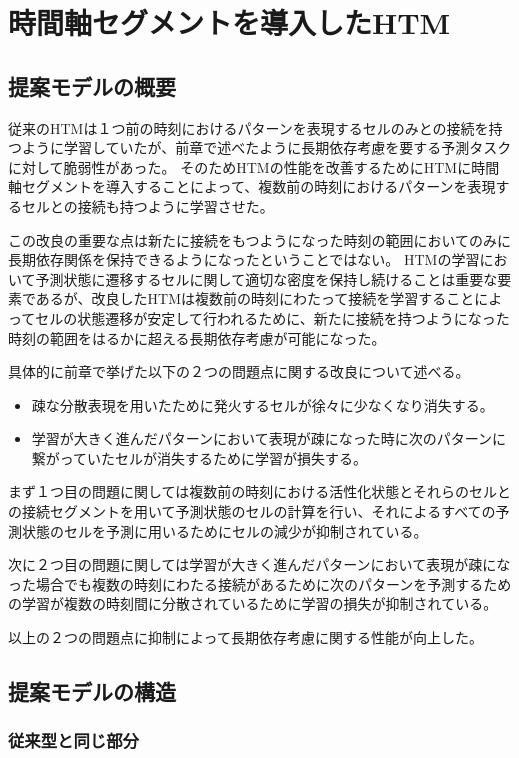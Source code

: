 \chapter{時間軸セグメントを導入したHTM}
\section{提案モデルの概要}
従来のHTMは１つ前の時刻におけるパターンを表現するセルのみとの接続を持つように学習していたが、前章で述べたように長期依存考慮を要する予測タスクに対して脆弱性があった。
そのためHTMの性能を改善するためにHTMに時間軸セグメントを導入することによって、複数前の時刻におけるパターンを表現するセルとの接続も持つように学習させた。

この改良の重要な点は新たに接続をもつようになった時刻の範囲においてのみに長期依存関係を保持できるようになったということではない。
HTMの学習において予測状態に遷移するセルに関して適切な密度を保持し続けることは重要な要素であるが、改良したHTMは複数前の時刻にわたって接続を学習することによってセルの状態遷移が安定して行われるために、新たに接続を持つようになった時刻の範囲をはるかに超える長期依存考慮が可能になった。

具体的に前章で挙げた以下の２つの問題点に関する改良について述べる。

\begin{itemize}
  \item 疎な分散表現を用いたために発火するセルが徐々に少なくなり消失する。
  \item 学習が大きく進んだパターンにおいて表現が疎になった時に次のパターンに繋がっていたセルが消失するために学習が損失する。
\end{itemize}

まず１つ目の問題に関しては複数前の時刻における活性化状態とそれらのセルとの接続セグメントを用いて予測状態のセルの計算を行い、それによるすべての予測状態のセルを予測に用いるためにセルの減少が抑制されている。

次に２つ目の問題に関しては学習が大きく進んだパターンにおいて表現が疎になった場合でも複数の時刻にわたる接続があるために次のパターンを予測するための学習が複数の時刻間に分散されているために学習の損失が抑制されている。

以上の２つの問題点に抑制によって長期依存考慮に関する性能が向上した。

\section{提案モデルの構造}
\subsection{従来型と同じ部分}

